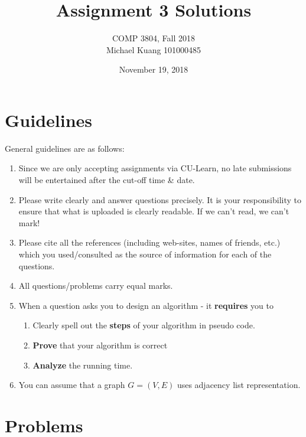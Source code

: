 \documentclass[12pt]{article}
\title{Assignment 3 Solutions}
\author{COMP 3804, Fall 2018 \\
	Michael Kuang 101000485}
\date{November 19, 2018}
\begin{document}
\maketitle

\section{Guidelines}
General guidelines are as follows:
\begin{enumerate}
\item Since we are only accepting assignments via CU-Learn, no late submissions will be entertained after the cut-off time \& date. 

\item Please write clearly and answer questions precisely.  It is your responsibility to ensure that what is uploaded is clearly readable. If we can't read, we can't mark!


\item Please cite all the references (including web-sites, names of friends,
etc.) which you used/consulted as the source of information for each of
the questions. 


\item All questions/problems carry equal marks. 

\item When a question asks you to design an algorithm - it {\bf requires} you to 
\begin{enumerate}
\item Clearly spell out the {\bf steps}  of your algorithm in pseudo code.
\item {\bf Prove} that your algorithm is correct 
\item {\bf Analyze} the running time. 
\end{enumerate}

\item You can assume that a graph  $G=(V,E)$ uses adjacency list representation. 

\end{enumerate}

\newpage

\section{Problems}
\end{document}
